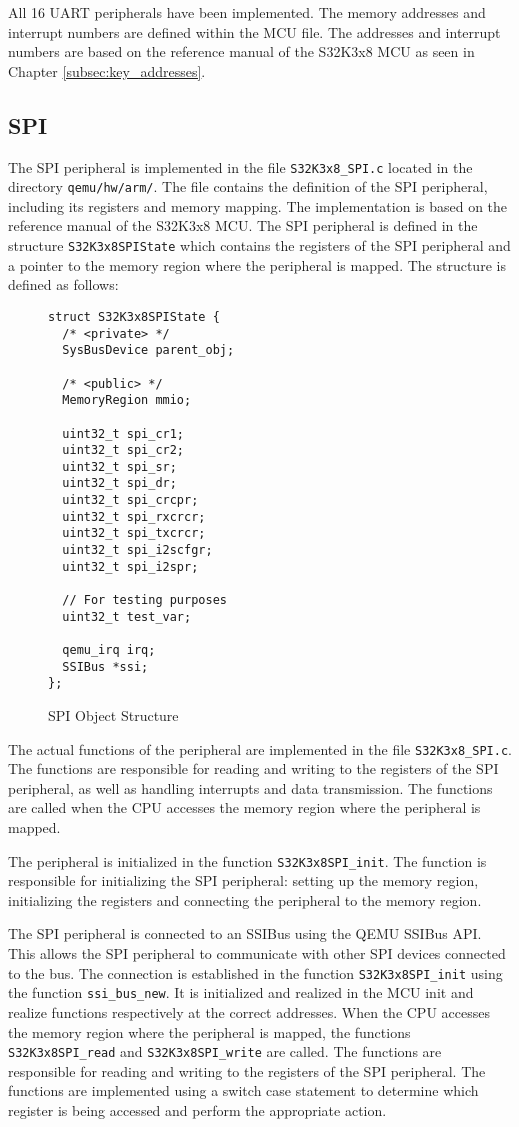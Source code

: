 All 16 UART peripherals have been implemented. The memory addresses and interrupt numbers are defined within the MCU file. The addresses and interrupt numbers are based on the reference manual of the S32K3x8 MCU as seen in Chapter \ref{subsec:key_addresses}. 

\subsection{SPI}
The SPI peripheral is implemented in the file \texttt{S32K3x8\_SPI.c} located in the directory \texttt{qemu/hw/arm/}. The file contains the definition of the SPI peripheral, including its registers and memory mapping. The implementation is based on the reference manual of the S32K3x8 MCU.
The SPI peripheral is defined in the structure \texttt{S32K3x8SPIState} which contains the registers of the SPI peripheral and a pointer to the memory region where the peripheral is mapped. The structure is defined as follows:
\begin{figure}
    \begin{verbatim}
struct S32K3x8SPIState {
  /* <private> */
  SysBusDevice parent_obj;

  /* <public> */
  MemoryRegion mmio;

  uint32_t spi_cr1;
  uint32_t spi_cr2;
  uint32_t spi_sr;
  uint32_t spi_dr;
  uint32_t spi_crcpr;
  uint32_t spi_rxcrcr;
  uint32_t spi_txcrcr;
  uint32_t spi_i2scfgr;
  uint32_t spi_i2spr;

  // For testing purposes
  uint32_t test_var;

  qemu_irq irq;
  SSIBus *ssi;
};
    \end{verbatim}
    \caption{SPI Object Structure}
    \label{fig:SPI_structure}
\end{figure}

The actual functions of the peripheral are implemented in the file \texttt{S32K3x8\_SPI.c}. The functions are responsible for reading and writing to the registers of the SPI peripheral, as well as handling interrupts and data transmission. The functions are called when the CPU accesses the memory region where the peripheral is mapped. 

The peripheral is initialized in the function \texttt{S32K3x8SPI\_init}. The function is responsible for initializing the SPI peripheral: setting up the memory region, initializing the registers and connecting the peripheral to the memory region. 

The SPI peripheral is connected to an SSIBus using the QEMU SSIBus API. This allows the SPI peripheral to communicate with other SPI devices connected to the bus. The connection is established in the function \texttt{S32K3x8SPI\_init} using the function \texttt{ssi\_bus\_new}. It is initialized and realized in the MCU init and realize functions respectively at the correct addresses.
When the CPU accesses the memory region where the peripheral is mapped, the functions \texttt{S32K3x8SPI\_read} and \texttt{S32K3x8SPI\_write} are called. The functions are responsible for reading and writing to the registers of the SPI peripheral. The functions are implemented using a switch case statement to determine which register is being accessed and perform the appropriate action.

